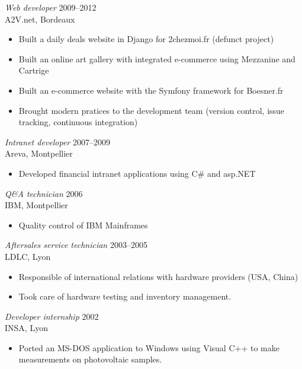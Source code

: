 \documentclass[margin]{res}
\begin{document}
\begin{resume}
{\sl Web developer\/} \hfill 2009--2012 \\
A2V.net, Bordeaux
\begin{itemize}  \itemsep -2pt
    \item Built a daily deals website in Django for 2chezmoi.fr  (defunct project)
    \item Built an online art gallery with integrated e-commerce using Mezzanine and Cartrige
    \item Built an e-commerce website with the Symfony framework for Boesner.fr
    \item Brought modern pratices to the development team (version control, issue tracking, continuous integration)
\end{itemize}

{\sl Intranet developer\/} \hfill 2007--2009 \\
Areva, Montpellier
\begin{itemize} \itemsep -2pt
    \item Developed financial intranet applications using C\# and asp.NET
\end{itemize}

{\sl Q\&A technician\/} \hfill 2006 \\
IBM, Montpellier
\begin{itemize}  \itemsep -2pt
    \item Quality control of IBM Mainframes
\end{itemize}

{\sl Aftersales service technician\/} \hfill     2003--2005 \\
LDLC, Lyon
\begin{itemize}  \itemsep -2pt
    \item Responsible of international relations with hardware providers (USA, China)
    \item Took care of hardware testing and inventory management.
\end{itemize}

{\sl Developer internship\/} \hfill 2002 \\
INSA, Lyon
\begin{itemize} \itemsep -2pt
    \item Ported an MS-DOS application to Windows using Visual C++ to make
    measurements on photovoltaic samples.
\end{itemize}


\end{resume}
\end{document}
